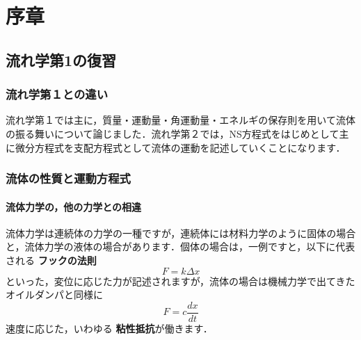 \documentclass[uplatex,12pt]{jsbook}
\newcommand{\strong}[1]{{\bf\color{violet} #1}}
\begin{document}
	\chapter{序章}
	\section{流れ学第1の復習}
	\subsection{流れ学第１との違い}
	流れ学第１では主に，質量・運動量・角運動量・エネルギの保存則を用いて流体の振る舞いについて論じました．流れ学第２では，NS方程式をはじめとして主に微分方程式を支配方程式として流体の運動を記述していくことになります．
	
	\subsection{流体の性質と運動方程式}
	\subsubsection{流体力学の，他の力学との相違}
	流体力学は連続体の力学の一種ですが，連続体には材料力学のように固体の場合と，流体力学の液体の場合があります．個体の場合は，一例ですと，以下に代表される\strong{フックの法則}
	\begin{equation}
		F = k\Delta x
	\end{equation}
	といった，変位に応じた力が記述されますが，流体の場合は機械力学で出てきたオイルダンパと同様に
	\begin{equation}
	F = c \frac{dx}{dt}
	\end{equation}
	速度に応じた，いわゆる\strong{粘性抵抗}が働きます．
	
\end{document}
